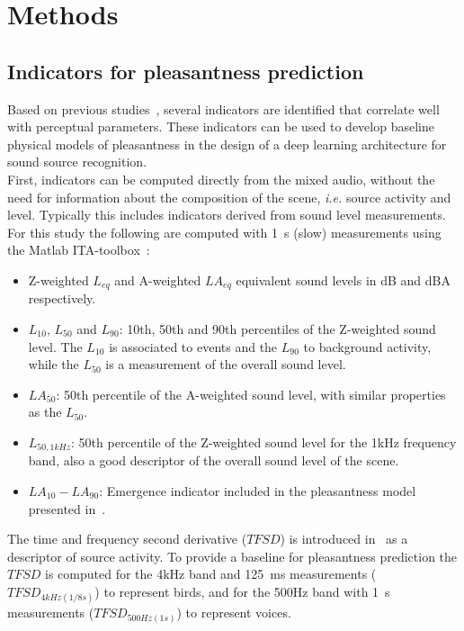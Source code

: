 \documentclass[11pt,a4paper]{article}
\begin{document}
\section{Methods}
\label{sec:methods}

\subsection{Indicators for pleasantness prediction}
\label{sec:methods_inds}

Based on previous studies~\cite{aumond2017, gontier2018, ricciardi2014}, several indicators are identified that correlate well with perceptual parameters. These indicators can be used to develop baseline physical models of pleasantness in the design of a deep learning architecture for sound source recognition.\\

First, indicators can be computed directly from the mixed audio, without the need for information about the composition of the scene, \textit{i.e.} source activity and level. Typically this includes indicators derived from sound level measurements. For this study the following are computed with 1~s (slow) measurements using the Matlab ITA-toolbox~\cite{itatoolbox2017}:

\begin{itemize}
\item Z-weighted $L_{eq}$ and A-weighted $LA_{eq}$ equivalent sound levels in dB and dBA respectively.
\item $L_{10}$, $L_{50}$ and $L_{90}$: 10th, 50th and 90th percentiles of the Z-weighted sound level. The $L_{10}$ is associated to events and the $L_{90}$ to background activity, while the $L_{50}$ is a measurement of the overall sound level.
\item $LA_{50}$: 50th percentile of the A-weighted sound level, with similar properties as the $L_{50}$.
\item $L_{50, 1kHz}$: 50th percentile of the Z-weighted sound level for the 1kHz frequency band, also a good descriptor of the overall sound level of the scene.
\item $LA_{10}-LA_{90}$: Emergence indicator included in the pleasantness model presented in~\cite{ricciardi2014}.
\end{itemize}

The time and frequency second derivative ($TFSD$) is introduced in~\cite{aumond2017} as a descriptor of source activity. To provide a baseline for pleasantness prediction the $TFSD$ is computed for the 4kHz band and 125~ms measurements ($TFSD_{4kHz(1/8s)}$) to represent birds, and for the 500Hz band with 1~s measurements ($TFSD_{500Hz(1s)}$) to represent voices.\\
\end{document}
